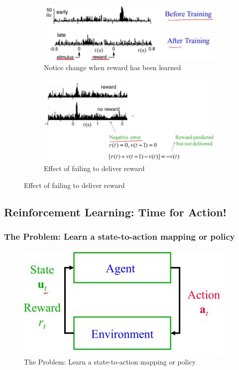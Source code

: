 \documentclass[]{article}
\begin{document}
\begin{figure}[H]
	\caption{Dopaminargenic cells in Ventral Tegmental Area.}
	\begin{subfigure}[t]{0.45\textwidth}
		\caption{Notice change when reward has been learned}
		\includegraphics[width=\textwidth]{reward-primate}
	\end{subfigure}
	\begin{subfigure}[t]{0.45\textwidth}
		\caption{Effect of failing to deliver reward}
		\includegraphics[width=\textwidth]{no-reward}
	\end{subfigure}
\end{figure}

\subsection{Reinforcement Learning: Time for Action!}

\subsubsection{The Problem: Learn a state-to-action mapping or policy}

\begin{figure}[H]
	\begin{center}
		\caption{The Problem: Learn a state-to-action mapping or policy}		\includegraphics[width=\textwidth]{reward-action-problem}
	\end{center}
\end{figure}
\end{document}
